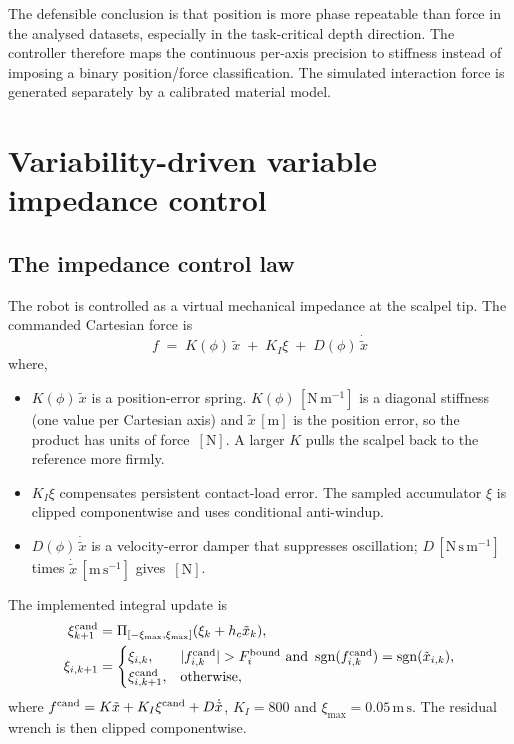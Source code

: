 \documentclass[11pt,a4paper]{article}
\newcommand{\xt}{\tilde{x}}
\newcommand{\xtd}{\dot{\tilde{x}}}
\newcommand{\unit}[1]{\,[\mathrm{#1}]}
\begin{document}
\noindent The defensible conclusion is that position is more phase repeatable
than force in the analysed datasets, especially in the task-critical depth
direction. The controller therefore maps the continuous per-axis precision to
stiffness instead of imposing a binary position/force classification. The
simulated interaction force is generated separately by a calibrated material
model.

\section{Variability-driven variable impedance control}
\label{sec:vic}

\subsection{The impedance control law}
The robot is controlled as a virtual mechanical impedance at the scalpel tip. The
commanded Cartesian force is
\begin{equation}
\boxed{\;f \;=\; K(\phi)\,\xt \;+\; K_I\xi \;+\; D(\phi)\,\xtd\;}
\label{eq:imp}
\end{equation}
where,
\begin{itemize}[leftmargin=1.5em]
\item $K(\phi)\,\xt$ is a position-error spring. $K(\phi)\unit{N\,m^{-1}}$ is a
diagonal stiffness (one value per Cartesian axis) and $\xt\unit{m}$ is the
position error, so the product has units of force $\unit{N}$. A larger $K$ pulls
the scalpel back to the reference more firmly.
\item $K_I\xi$ compensates persistent contact-load error. The sampled
accumulator $\xi$ is clipped componentwise and uses conditional anti-windup.
\item $D(\phi)\,\xtd$ is a velocity-error damper that suppresses oscillation;
$D\unit{N\,s\,m^{-1}}$ times $\xtd\unit{m\,s^{-1}}$ gives $\unit{N}$.
\end{itemize}
The implemented integral update is
\begin{align}
\xi_{k+1}^{\rm cand}
&=\Pi_{[-\xi_{\max},\xi_{\max}]}
(\xi_k+h_c\tilde x_k),\\
\xi_{i,k+1}
&=\begin{cases}
\xi_{i,k},&
|f^{\rm cand}_{i,k}|>F_i^{\rm bound}\ \text{and}\
\operatorname{sgn}(f^{\rm cand}_{i,k})
=\operatorname{sgn}(\tilde x_{i,k}),\\
\xi_{i,k+1}^{\rm cand},&\text{otherwise},
\end{cases}
\end{align}
where $f^{\rm cand}=K\tilde x+K_I\xi^{\rm cand}+D\dot{\tilde x}$,
$K_I=800$ and $\xi_{\max}=0.05\,\mathrm{m\,s}$. The residual wrench is then
clipped componentwise.
\end{document}
